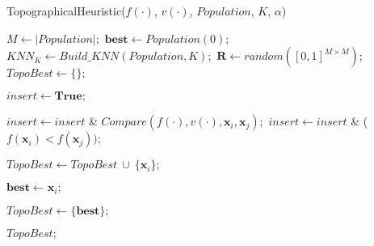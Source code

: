 \begin{algorithm*}
\caption{TopographicalHeuristic($f(\cdot)$, $v(\cdot)$, $Population$, $K$, $\alpha$)}
\label{alg:TopographicalHeuristic}
\begin{spacing}{1.5}
\begin{algorithmic}[1]


\State $M \gets |Population|;$
\State $\bm{best} \gets Population(0);$
\State $KNN_K \gets Build\_KNN(Population, K);$
\State $\bm{R} \gets random([0, 1]^{M \times M});$
\State $TopoBest \gets \{\};$


\State $insert \gets \bm{True};$

		\State $insert \gets insert$ \& $Compare(f(\cdot), v(\cdot), \bm{x}_i, \bm{x}_j);$
	\Else
		\State $insert \gets insert$ \& ($f(\bm{x}_i) < f(\bm{x}_j));$
	\EndIf
\EndFor

\State $TopoBest \gets TopoBest \ \cup \ \{\bm{x}_i\};$
\EndIf

\State $\bm{best} \gets \bm{x}_i;$
\EndIf
\EndFor

	\State $TopoBest \gets \{\bm{best}\};$
\EndIf

\State \Return $TopoBest;$



\end{algorithmic}
\end{spacing}
\end{algorithm*}